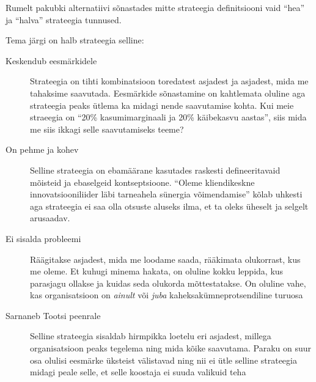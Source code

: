 \documentclass{tufte-book}
\begin{document}
Rumelt pakubki alternatiivi sõnastades mitte strateegia definitsiooni vaid \enquote{hea} ja \enquote{halva} strateegia tunnused. 

Tema järgi on halb strateegia selline:
\begin{description}
	\item[Keskendub eesmärkidele] Strateegia on tihti kombinatsioon toredatest asjadest ja asjadest, mida me tahaksime saavutada. Eesmärkide sõnastamine on kahtlemata oluline aga strateegia peaks ütlema ka midagi nende saavutamise kohta. Kui meie straeegia on \enquote{20\% kasumimarginaali ja 20\% käibekasvu aastas}, siis mida me siis ikkagi selle saavutamiseks teeme?
	\item[On pehme ja kohev] Selline strateegia on ebamäärane kasutades raskesti defineeritavaid mõisteid ja ebaselgeid kontseptsioone. \enquote{Oleme kliendikeskne innovatsiooniliider läbi tarneahela sünergia võimendamise} kõlab uhkesti aga strateegia ei saa olla otsuste aluseks ilma, et ta oleks üheselt ja selgelt arusaadav. 
	\item[Ei sisalda probleemi] Räägitakse asjadest, mida me loodame saada, rääkimata olukorrast, kus me oleme. Et kuhugi minema hakata, on oluline kokku leppida, kus parasjagu ollakse ja kuidas seda olukorda mõttestatakse. On oluline vahe, kas organisatsioon on \emph{ainult} või \emph{juba} kaheksakümneprotsendiline turuosa
	\item[Sarnaneb Tootsi peenrale] Selline strateegia sisaldab hirmpikka loetelu eri asjadest, millega organisatsioon peaks tegelema ning mida kõike saavutama. Paraku on suur osa olulisi eesmärke üksteist välistavad ning nii ei ütle selline strateegia midagi peale selle, et selle koostaja ei suuda valikuid teha
\end{description}
\end{document}
